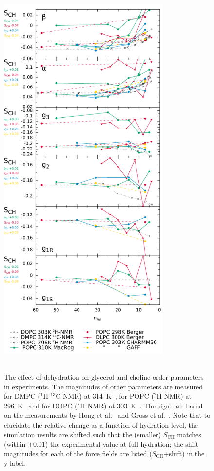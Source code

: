 \documentclass[journal=jacsat,manuscript=article]{achemso}
\begin{document}
\begin{figure}[]
  \centering
  \includegraphics[width=8.6cm]{../DATAreportediINblog/dehydration.pdf} \\
   \\
  \caption{\label{ordPhydr}
    The effect of dehydration on glycerol and choline order parameters in experiments.
    The magnitudes of order parameters are measured for DMPC ($^1$H-$^{13}$C NMR) at 314~K~\cite{dvinskikh05b}, 
    for POPC ($^2$H NMR) at 296~K~\cite{bechinger91} and for DOPC ($^2$H NMR) at 303~K~\cite{ulrich94}. 
    The signs are based on the measurements by Hong et al.~\cite{hong95a,hong95b} 
    and Gross et al.~\cite{gross97}.
    Note that to elucidate the relative change as a function of hydration level,
    the simulation results are shifted such that the (smaller) $S_\mathrm{CH}$
    matches (within $\pm$0.01) the experimental value at full hydration;
    the shift magnitudes for each of the force fields are listed ($S_\mathrm{CH}$+shift) in the y-label.
  }
\end{figure}
\end{document}
